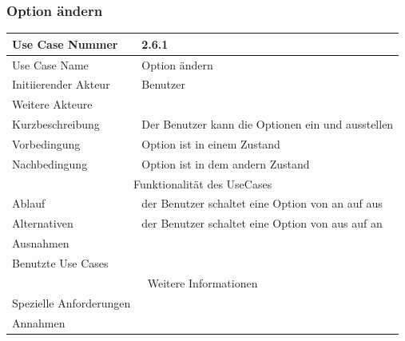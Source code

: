 \documentclass[10pt,a4paper]{article}
\begin{document}
\subsubsection{Option \"andern}
		\begin{tabular}{|l|p{.5\linewidth}|}
		\hline Use Case Nummer & 2.6.1 \\ 
		\hline Use Case Name & Option \"andern \\ 
		\hline Initiierender Akteur & Benutzer \\
		\hline Weitere Akteure &  \\
		\hline Kurzbeschreibung & Der Benutzer kann die Optionen ein und ausstellen \\
		\hline Vorbedingung & Option ist in einem Zustand \\
		\hline Nachbedingung & Option ist in dem andern Zustand \\
		\hline \multicolumn{2}{|c|}{Funktionalität des UseCases}\\
		\hline Ablauf & der Benutzer schaltet eine Option von an auf aus\\
		\hline Alternativen & der Benutzer schaltet eine Option von aus auf an \\
		\hline Ausnahmen &  \\
		\hline Benutzte Use Cases &  \\
		\hline \multicolumn{2}{|c|}{Weitere Informationen} \\
		\hline Spezielle Anforderungen &  \\
		\hline Annahmen &  \\
		\hline
		\end{tabular}
\end{document}
